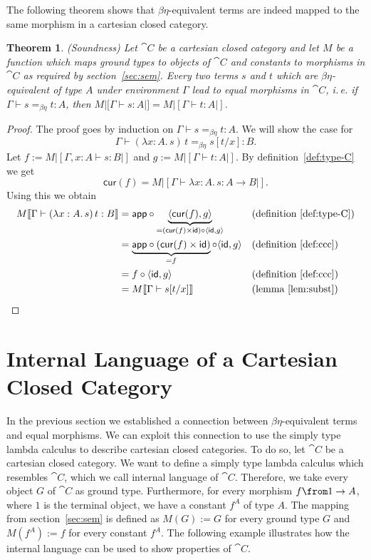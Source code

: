 \documentclass{article}
\newtheorem{theorem}[defn]{Theorem}
\newcommand{\type}{\vdash}
\newcommand{\term}{1}
\newcommand{\app}{\mathsf{app}}
\newcommand{\cur}{\mathsf{cur}}
\begin{document}
The following theorem shows that $\beta\eta$-equivalent terms are indeed mapped to the same morphism in a cartesian closed category.

\begin{theorem}{(Soundness)}
    \label{thm:sound}
    Let $\cat{C}$ be a cartesian closed category and
    let $M$ be a function which maps ground types to objects of $\cat{C}$ and constants to morphisms in $\cat{C}$ as required by section~\ref{sec:sem}.
    Every two terms $s$ and $t$ which are $\beta\eta$-equivalent of type $A$ under environment $\Gamma$ lead to equal morphisms in $\cat{C}$, i.\,e.
    if $\Gamma \type s =_{\beta\eta} t: A$, then $M|[\Gamma \type s: A|] = M|[\Gamma \type t: A|]$.
\end{theorem}
\begin{proof}
    The proof goes by induction on $\Gamma \type s =_{\beta\eta} t: A$.
    We will show the case for
    \[\Gamma \type (\lambda x:A.\, s)\, t =_{\beta\eta} s[t/x]: B.\]
    Let $f := M|[\Gamma, x: A \type s: B|]$ and $g := M|[\Gamma \type t: A|]$.
    By definition~\ref{def:type-C} we get \[\cur(f) = M|[\Gamma \type \lambda x: A.\, s: A \to B|].\]
    Using this we obtain
    \begin{align*}
        M|[\Gamma \type (\lambda x: A.\, s)\, t: B|] & = \app \circ \underbrace{\langle \cur(f), g \rangle}_{= (\cur(f) \times \mathsf{id}) \circ \langle \mathsf{id}, g \rangle} && (\text{definition}~\ref{def:type-C}) \\
                                                     & = \underbrace{\app \circ (\cur(f) \times \mathsf{id})}_{= f} \circ \langle \mathsf{id}, g \rangle && (\text{definition}~\ref{def:ccc})\\
                                                     & = f \circ \langle \mathsf{id}, g \rangle && (\text{definition}~\ref{def:ccc})\\
                                                     & = M|[\Gamma \type s[t/x]|] && (\text{lemma}~\ref{lem:subst})
    \end{align*}
\end{proof}


\section{Internal Language of a Cartesian Closed Category}

In the previous section we established a connection between $\beta\eta$-equivalent terms and equal morphisms.
We can exploit this connection to use the simply type lambda calculus to describe cartesian closed categories.
To do so, let $\cat{C}$ be a cartesian closed category.
We want to define a simply type lambda calculus which resembles $\cat{C}$, which we call internal language of $\cat{C}$.
Therefore, we take every object $G$ of $\cat{C}$ as ground type.
Furthermore, for every morphism $f \from \term \to A$, where $\term$ is the terminal object, we have a constant $f^A$ of type $A$.
The mapping from section~\ref{sec:sem} is defined as $M(G) := G$ for every ground type $G$ and $M(f^A) := f$ for every constant $f^A$.
The following example illustrates how the internal language can be used to show properties of $\cat{C}$.
\end{document}

